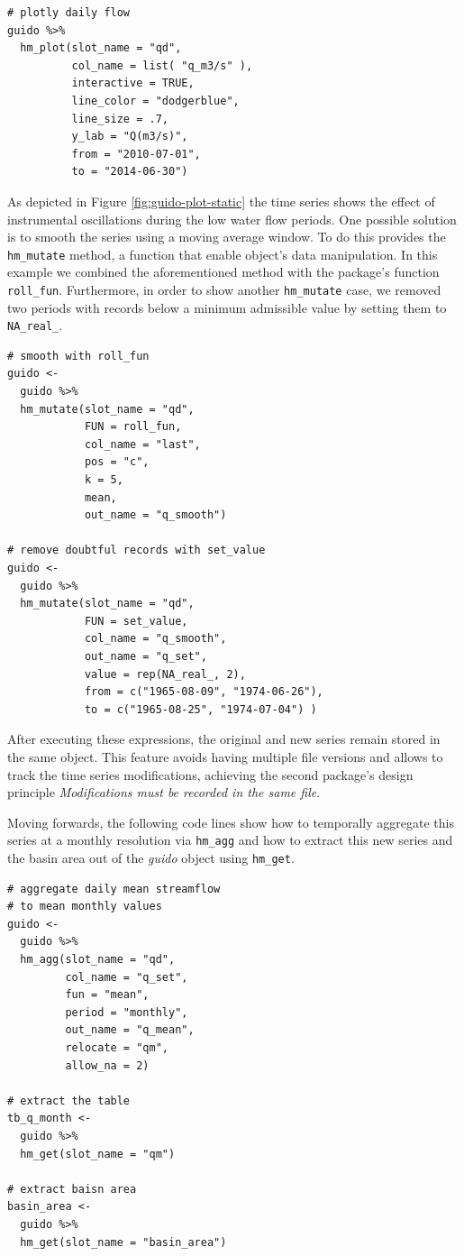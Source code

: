 \begin{verbatim}
# plotly daily flow
guido %>% 
  hm_plot(slot_name = "qd",
          col_name = list( "q_m3/s" ), 
          interactive = TRUE, 
          line_color = "dodgerblue",
          line_size = .7,
          y_lab = "Q(m3/s)", 
          from = "2010-07-01",
          to = "2014-06-30") 
\end{verbatim}

As depicted in Figure \ref{fig:guido-plot-static} the time
series shows the effect of instrumental oscillations during the low water
flow periods.
One possible solution is to smooth the series using a moving average window.
To do this  provides the \texttt{hm\_mutate}
method, a function that enable object's data manipulation. In this
example we combined the aforementioned method with the package's
function \texttt{roll\_fun}. Furthermore, in order to show another \texttt{hm\_mutate}
case, we removed two periods with records below a minimum
admissible value by setting them to \texttt{NA\_real\_}.

\begin{verbatim}
# smooth with roll_fun
guido <- 
  guido %>%
  hm_mutate(slot_name = "qd",
            FUN = roll_fun,
            col_name = "last",
            pos = "c",
            k = 5,
            mean,
            out_name = "q_smooth") 

# remove doubtful records with set_value
guido <- 
  guido %>%
  hm_mutate(slot_name = "qd",
            FUN = set_value,
            col_name = "q_smooth",
            out_name = "q_set",
            value = rep(NA_real_, 2),
            from = c("1965-08-09", "1974-06-26"),
            to = c("1965-08-25", "1974-07-04") )
\end{verbatim}

\noindent
After executing these expressions, the original and new series remain
stored in the same object. This feature avoids having multiple file
versions and allows to track the time series modifications,
achieving the second package's design principle
\emph{Modifications must be recorded in the same file}.

Moving forwards, the following code lines show how to temporally
aggregate this series at a monthly resolution via \texttt{hm\_agg} and how
to extract this new series and the basin area out of the
\emph{guido} object using \texttt{hm\_get}.

\begin{verbatim}
# aggregate daily mean streamflow 
# to mean monthly values
guido <- 
  guido %>%
  hm_agg(slot_name = "qd",
         col_name = "q_set", 
         fun = "mean", 
         period = "monthly", 
         out_name = "q_mean", 
         relocate = "qm", 
         allow_na = 2)

# extract the table 
tb_q_month <- 
  guido %>% 
  hm_get(slot_name = "qm")

# extract baisn area
basin_area <- 
  guido %>% 
  hm_get(slot_name = "basin_area")
\end{verbatim}

